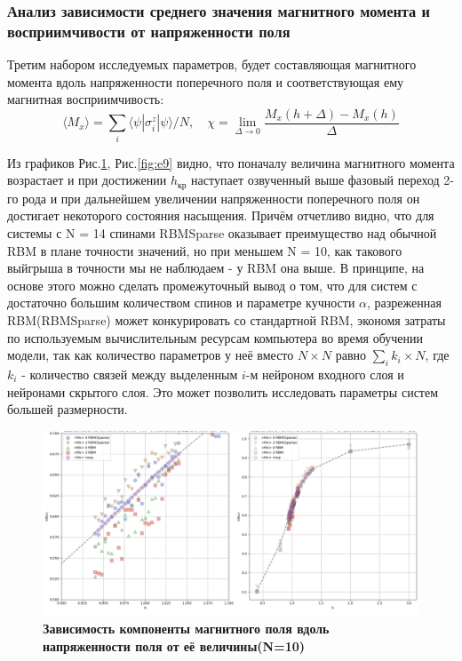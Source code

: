 \subsubsection{Анализ зависимости среднего значения магнитного момента и восприимчивости от  напряженности поля}

Третим набором исследуемых параметров, будет составляющая магнитного момента вдоль напряженности поперечного поля и соответствующая ему магнитная восприимчивость: \begin{equation}
\langle M_x \rangle = \sum_i \langle \psi | \sigma_i^z | \psi \rangle / N, \quad \chi = \lim_{\Delta \to 0} \frac{M_x(h + \Delta) - M_x(h)}{\Delta}
\end{equation}

Из графиков Рис.\ref{fig:e8}, Рис.\ref{fig:e9} видно, что поначалу величина магнитного момента возрастает и при достижении \(h_{\text{кр}} \) наступает озвученный выше  фазовый переход 2-го рода и при дальнейшем увеличении напряженности поперечного поля он достигает некоторого состояния насыщения. Причём отчетливо видно, что для системы с N = 14 спинами RBMSparse оказывает преимущество над обычной RBM в плане точности значений, но при меньшем N = 10, как такового выйгрыша в точности мы не наблюдаем - у RBM она выше. В принципе, на основе этого можно сделать промежуточный вывод о том, что для систем с достаточно большим количеством спинов и параметре кучности \(\alpha \), разреженная RBM(RBMSparse) может конкурировать со стандартной RBM, экономя затраты по используемым вычислительным ресурсам компьютера во время обучении модели, так как количество параметров у неё вместо \(N \times N\) равно \(\sum_i k_i \times N\), где \(k_i\) - количество связей между выделенным \(i\)-м нейроном входного слоя и нейронами скрытого слоя. Это может позволить исследовать параметры систем большей размерности.
\begin{figure}[H]
    \centering
    \includegraphics[width=1\linewidth]{Course_work/Images/Mm-N-10.png}
    \caption{\textbf{Зависимость компоненты магнитного поля вдоль напряженности поля от её величины(N=10)}}
    \label{fig:e8}
\end{figure}


